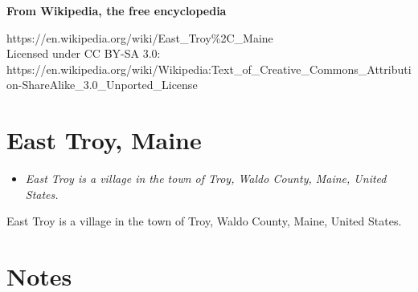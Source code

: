 \textbf{From Wikipedia, the free encyclopedia}

https://en.wikipedia.org/wiki/East\_Troy\%2C\_Maine\\
Licensed under CC BY-SA 3.0:\\
https://en.wikipedia.org/wiki/Wikipedia:Text\_of\_Creative\_Commons\_Attribution-ShareAlike\_3.0\_Unported\_License

\section{East Troy, Maine}\label{east-troy-maine}

\begin{itemize}
\item
  \emph{East Troy is a village in the town of Troy, Waldo County, Maine,
  United States.}
\end{itemize}

East Troy is a village in the town of Troy, Waldo County, Maine, United
States.

\section{Notes}\label{notes}
